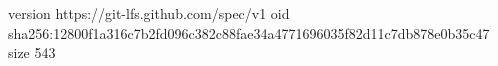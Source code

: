 version https://git-lfs.github.com/spec/v1
oid sha256:12800f1a316c7b2fd096c382c88fae34a4771696035f82d11c7db878e0b35c47
size 543
